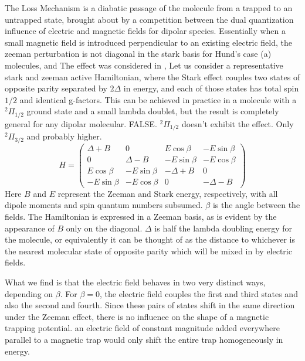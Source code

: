 \documentclass[%
 reprint,
 amsmath,amssymb,
 aps,
prl,
]{revtex4-1}
\begin{document}
The Loss Mechanism is a diabatic passage of the molecule from a trapped to an untrapped state, brought about by a competition between the dual quantization influence of electric and magnetic fields for dipolar species. Essentially when a small magnetic field is introduced perpendicular to an existing electric field, the zeeman perturbation is not diagonal in the stark basis for Hund's case (a) molecules, and The effect was considered in \cite{Lara2008},  Let us consider a representative stark and zeeman active Hamiltonian, where the Stark effect couples two states of opposite parity separated by $2\Delta$ in energy, and each of those states has total spin $1/2$ and identical g-factors. This can be achieved in practice in a molecule with a $^2\Pi_{1/2}$ ground state and a small lambda doublet, but the result is completely general for any dipolar molecular. FALSE. $^2\Pi_{1/2}$ doesn't exhibit the effect. Only $^2\Pi_{3/2}$ and probably higher.
\begin{equation}
H = \left(
\begin{matrix}
    \Delta+B         &         0                       & E\cos{\beta}                             &          -  E\sin{\beta}                     \\
                0                   & \Delta-B          &            - E\sin{\beta}                 &-E\cos{\beta}   \\
    E\cos{\beta} &        -   E\sin{\beta}                      & -\Delta+B                &            0                     \\
           -      E\sin{\beta}                   & -E\cos{\beta} &             0                 & -\Delta-B 
\end{matrix} 
\right)
\end{equation}
Here $B$ and $E$ represent the Zeeman and Stark energy, respectively, with all dipole moments and spin quantum numbers subsumed. $\beta$ is the angle between the fields. The Hamiltonian is expressed in a Zeeman basis, as is evident by the appearance of $B$ only on the diagonal. $\Delta$ is half the lambda doubling energy for the molecule, or equivalently it can be thought of as the distance to whichever is the nearest molecular state of opposite parity which will be mixed in by electric fields. 

What we find is that the electric field behaves in two very distinct ways, depending on $\beta$. For $\beta=0$, the electric field couples the first and third states and also the second and fourth. Since these pairs of states shift in the same direction under the Zeeman effect, there is no influence on the shape of a magnetic trapping potential. an electric field of constant magnitude added everywhere parallel to a magnetic trap would only shift the entire trap homogeneously in energy.
\end{document}
